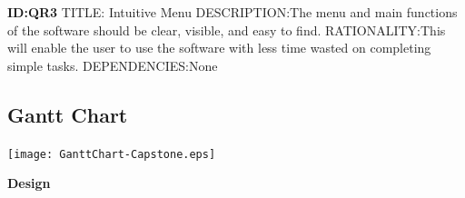 \documentclass[onecolumn, draftclsnofoot,10pt, compsoc]{IEEEtran}
\begin{document}
\begin{singlespace}
    \textbf{ID:QR3}\newline
    TITLE: Intuitive Menu\newline
    DESCRIPTION:The menu and main functions of the software should be clear, visible, and easy to find.\newline
    RATIONALITY:This will enable the user to use the software with less time wasted on completing simple tasks.\newline
    DEPENDENCIES:None\newline

    
    

\subsection{Gantt Chart}
\texttt{[image: GanttChart-Capstone.eps]}
\par
\textbf{\Large Design}

\end{singlespace}
\end{document}
